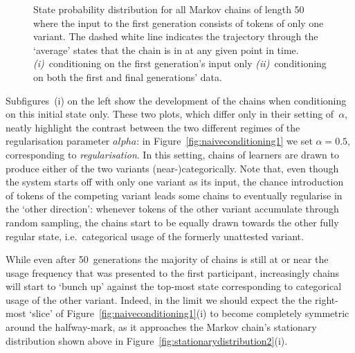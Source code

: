 \begin{figure}[htbp]

{\centering {}

}

\caption[State probability distribution for all Markov chains where the input to the first generation consists of tokens of only one variant]{State probability distribution for all Markov chains of length 50 where the input to the first generation consists of tokens of only one variant. The dashed white line indicates the trajectory through the `average' states that the chain is in at any given point in time. \emph{(i)}~conditioning on the first generation's input only \emph{(ii)}~conditioning on both the first and final generations' data.}\label{fig:naiveconditioning}
\end{figure}



Subfigures~(i) on the left show the development of the chains when conditioning on this initial state only. These two plots, which differ only in their setting of~$\alpha$, neatly highlight the contrast between the two different regimes of the regularisation parameter $alpha$: in Figure~\ref{fig:naiveconditioning1} we set $\alpha=0.5$, corresponding to \emph{regularisation}. In this setting, chains of learners are drawn to produce either of the two variants (near-)categorically. Note that, even though the system starts off with only one variant as its input, the chance introduction of tokens of the competing variant leads some chains to eventually regularise in the `other direction': whenever tokens of the other variant accumulate through random sampling, the chains start to be equally drawn towards the other fully regular state, i.e.~categorical usage of the formerly unattested variant.

While even after 50~generations the majority of chains is still at or near the usage frequency that was presented to the first participant, increasingly chains will start to `bunch up' against the top-most state corresponding to categorical usage of the other variant. Indeed, in the limit we should expect the the right-most `slice' of Figure~\ref{fig:naiveconditioning1}(i) to become completely symmetric around the halfway-mark, as it approaches the Markov chain's stationary distribution shown above in Figure~\ref{fig:stationarydistribution2}(i).

